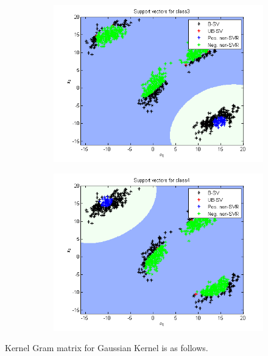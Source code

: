\documentclass{article}
\begin{document}
\begin{figure}
\begin{subfigure}{.5\textwidth}
  \centering
  \includegraphics[width=.8\linewidth]{Classification/1a/nu_g/sv3}
 
\end{subfigure}%
\begin{subfigure}{.5\textwidth}
  \centering
  \includegraphics[width=.8\linewidth]{Classification/1a/nu_g/sv4}
  
\end{subfigure}
\end{figure}
Kernel Gram matrix for Gaussian Kernel is as follows.
\end{document}
